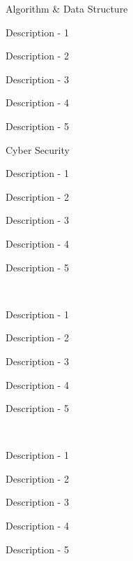 \documentclass[11pt, a4paper]{resume-lab}
\begin{document}
\begin{Parallel}[v]{0.265\textwidth}{0.66\textwidth}
{\begin{textblock}{2}
				\skillsection
				{Algorithm \& Data Structure}
				{
					\begin{skillitems} %
						\item {Description - 1}
						\item {Description - 2}
						\item {Description - 3}
						\item {Description - 4}
						\item {Description - 5}
					\end{skillitems}
				}
				
				\skillsection
				{Cyber Security}
				{
					\begin{skillitems} %
						\item {Description - 1}
						\item {Description - 2}
						\item {Description - 3}
						\item {Description - 4}
						\item {Description - 5}
					\end{skillitems}
				}
				
				\vspace{5mm}\\
				\interestsection
				{
					\begin{skillitems} %
						\item {Description - 1}
						\item {Description - 2}
						\item {Description - 3}
						\item {Description - 4}
						\item {Description - 5}
					\end{skillitems}
				}
				
				\vspace{5mm}\\
				\interestsection
				{
					\begin{skillitems} %
						\item {Description - 1}
						\item {Description - 2}
						\item {Description - 3}
						\item {Description - 4}
						\item {Description - 5}
					\end{skillitems}
				}
			\end{textblock}
		}
		\ParallelPar
		
	\end{Parallel}
	
	
	
	
	
	
	
\end{document}
